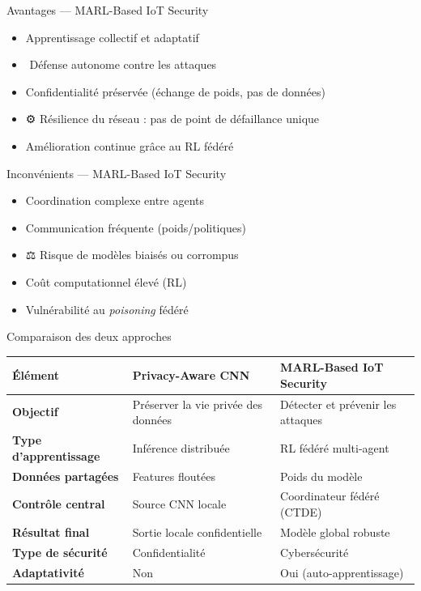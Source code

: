 \documentclass{beamer}
\begin{document}
\begin{frame}{Avantages — MARL-Based IoT Security}
\begin{itemize}
    \item  Apprentissage collectif et adaptatif
    \item ️ Défense autonome contre les attaques
    \item  Confidentialité préservée (échange de poids, pas de données)
    \item ⚙️ Résilience du réseau : pas de point de défaillance unique
    \item  Amélioration continue grâce au RL fédéré
\end{itemize}
\end{frame}

\begin{frame}{Inconvénients — MARL-Based IoT Security}
\begin{itemize}
    \item  Coordination complexe entre agents
    \item  Communication fréquente (poids/politiques)
    \item ⚖️ Risque de modèles biaisés ou corrompus
    \item  Coût computationnel élevé (RL)
    \item  Vulnérabilité au \textit{poisoning} fédéré
\end{itemize}
\end{frame}

\begin{frame}{Comparaison des deux approches}
\small
\begin{tabular}{>{\bfseries}m{3.2cm} m{4cm} m{4cm}}
\toprule
\textbf{Élément} & \textbf{Privacy-Aware CNN} & \textbf{MARL-Based IoT Security} \\
\midrule
Objectif & Préserver la vie privée des données & Détecter et prévenir les attaques \\
Type d’apprentissage & Inférence distribuée & RL fédéré multi-agent \\
Données partagées & Features floutées & Poids du modèle \\
Contrôle central & Source CNN locale & Coordinateur fédéré (CTDE) \\
Résultat final & Sortie locale confidentielle & Modèle global robuste \\
Type de sécurité & Confidentialité & Cybersécurité \\
Adaptativité & Non & Oui (auto-apprentissage) \\
\bottomrule
\end{tabular}
\end{frame}
\end{document}
